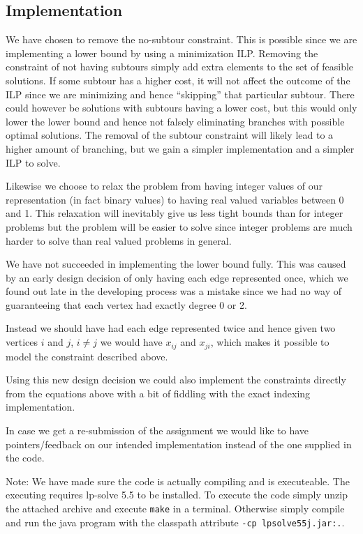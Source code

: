 \subsection{Implementation}
We have chosen to remove the no-subtour constraint. This is possible since we
are implementing a lower bound by using a minimization ILP. Removing the
constraint of not having subtours simply add extra elements to the set of
feasible solutions. If some subtour has a higher cost, it will not affect
the outcome of the ILP since we are minimizing and hence ``skipping'' that
particular subtour. There could however be solutions with subtours having
a lower cost, but this would only lower the lower bound and hence not
falsely eliminating branches with possible optimal solutions. The removal
of the subtour constraint will likely lead to a higher amount of
branching, but we gain a simpler implementation and a simpler ILP to
solve.

Likewise we choose to relax the problem from having integer values of our
representation (in fact binary values) to having real valued variables
between 0 and 1. This relaxation will inevitably give us less tight bounds
than for integer problems but the problem will be easier to solve since
integer problems are much harder to solve than real valued problems in
general.

We have not succeeded in implementing the lower bound fully. This was
caused by an early design decision of only having each edge represented once,
which we found out late in the developing process was a mistake since we
had no way of guaranteeing that each vertex had exactly degree 0 or 2.

Instead we should have had each edge represented twice and hence given two
vertices $i$ and $j$, $i \not= j$ we would have $x_{ij}$ and $x_{ji}$,
which makes it possible to model the constraint described above.

Using this new design decision we could also implement the constraints
directly from the equations above with a bit of fiddling with the exact
indexing implementation.

In case we get a re-submission of the assignment we would like to have
pointers/feedback on our intended implementation instead of the one
supplied in the code.

Note: We have made sure the code is actually compiling and is executeable.
The executing requires lp-solve 5.5 to be installed. To execute the code
simply unzip the attached archive and execute \texttt{make} in a terminal.
Otherwise simply compile and run the java program with the classpath
attribute \texttt{-cp lpsolve55j.jar:.}.
